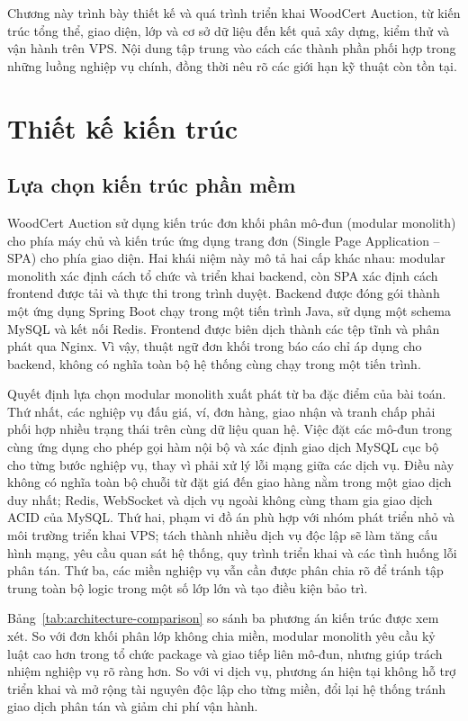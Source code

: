 \documentclass[../DoAn.tex]{subfiles}
\begin{document}
\raggedbottom

Chương này trình bày thiết kế và quá trình triển khai WoodCert Auction, từ kiến trúc tổng thể, giao diện, lớp và cơ sở dữ liệu đến kết quả xây dựng, kiểm thử và vận hành trên VPS. Nội dung tập trung vào cách các thành phần phối hợp trong những luồng nghiệp vụ chính, đồng thời nêu rõ các giới hạn kỹ thuật còn tồn tại.

\section{Thiết kế kiến trúc}

\subsection{Lựa chọn kiến trúc phần mềm}

WoodCert Auction sử dụng kiến trúc đơn khối phân mô-đun (modular monolith) cho phía máy chủ và kiến trúc ứng dụng trang đơn (Single Page Application -- SPA) cho phía giao diện. Hai khái niệm này mô tả hai cấp khác nhau: modular monolith xác định cách tổ chức và triển khai backend, còn SPA xác định cách frontend được tải và thực thi trong trình duyệt. Backend được đóng gói thành một ứng dụng Spring Boot chạy trong một tiến trình Java, sử dụng một schema MySQL và kết nối Redis. Frontend được biên dịch thành các tệp tĩnh và phân phát qua Nginx. Vì vậy, thuật ngữ đơn khối trong báo cáo chỉ áp dụng cho backend, không có nghĩa toàn bộ hệ thống cùng chạy trong một tiến trình.

Quyết định lựa chọn modular monolith xuất phát từ ba đặc điểm của bài toán. Thứ nhất, các nghiệp vụ đấu giá, ví, đơn hàng, giao nhận và tranh chấp phải phối hợp nhiều trạng thái trên cùng dữ liệu quan hệ. Việc đặt các mô-đun trong cùng ứng dụng cho phép gọi hàm nội bộ và xác định giao dịch MySQL cục bộ cho từng bước nghiệp vụ, thay vì phải xử lý lỗi mạng giữa các dịch vụ. Điều này không có nghĩa toàn bộ chuỗi từ đặt giá đến giao hàng nằm trong một giao dịch duy nhất; Redis, WebSocket và dịch vụ ngoài không cùng tham gia giao dịch ACID của MySQL. Thứ hai, phạm vi đồ án phù hợp với nhóm phát triển nhỏ và môi trường triển khai VPS; tách thành nhiều dịch vụ độc lập sẽ làm tăng cấu hình mạng, yêu cầu quan sát hệ thống, quy trình triển khai và các tình huống lỗi phân tán. Thứ ba, các miền nghiệp vụ vẫn cần được phân chia rõ để tránh tập trung toàn bộ logic trong một số lớp lớn và tạo điều kiện bảo trì.

Bảng~\ref{tab:architecture-comparison} so sánh ba phương án kiến trúc được xem xét. So với đơn khối phân lớp không chia miền, modular monolith yêu cầu kỷ luật cao hơn trong tổ chức package và giao tiếp liên mô-đun, nhưng giúp trách nhiệm nghiệp vụ rõ ràng hơn. So với vi dịch vụ, phương án hiện tại không hỗ trợ triển khai và mở rộng tài nguyên độc lập cho từng miền, đổi lại hệ thống tránh giao dịch phân tán và giảm chi phí vận hành.
\end{document}
